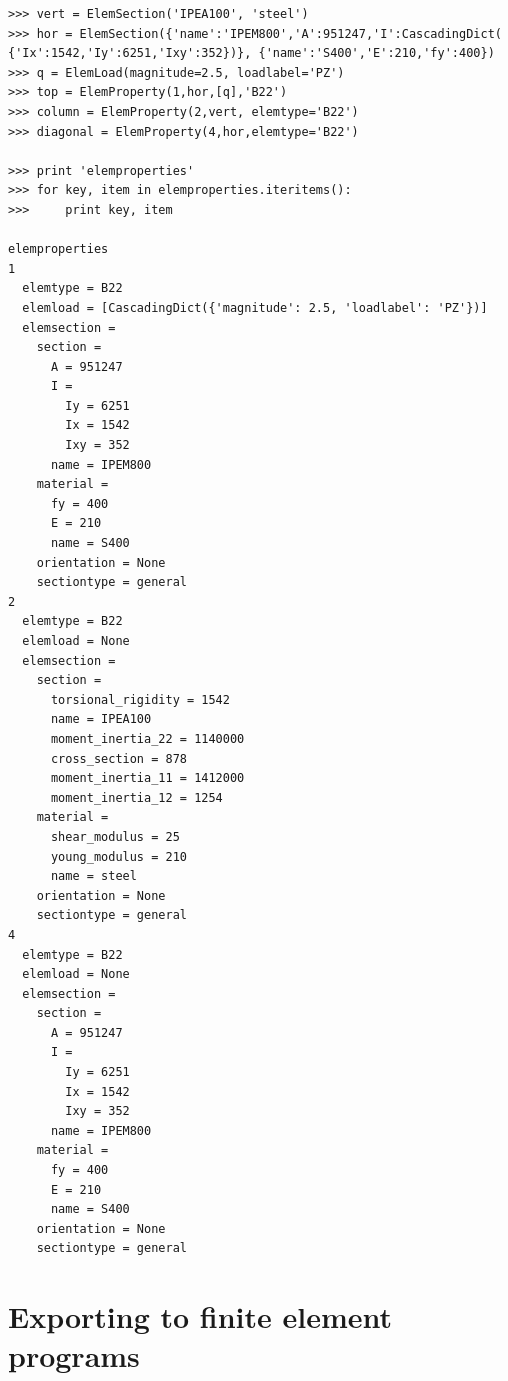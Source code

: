 \begin{verbatim}
>>> vert = ElemSection('IPEA100', 'steel')
>>> hor = ElemSection({'name':'IPEM800','A':951247,'I':CascadingDict(
{'Ix':1542,'Iy':6251,'Ixy':352})}, {'name':'S400','E':210,'fy':400})
>>> q = ElemLoad(magnitude=2.5, loadlabel='PZ')
>>> top = ElemProperty(1,hor,[q],'B22')
>>> column = ElemProperty(2,vert, elemtype='B22')
>>> diagonal = ElemProperty(4,hor,elemtype='B22')

>>> print 'elemproperties'
>>> for key, item in elemproperties.iteritems():
>>>     print key, item    

elemproperties
1
  elemtype = B22
  elemload = [CascadingDict({'magnitude': 2.5, 'loadlabel': 'PZ'})]
  elemsection =
    section =
      A = 951247
      I =
        Iy = 6251
        Ix = 1542
        Ixy = 352
      name = IPEM800
    material =
      fy = 400
      E = 210
      name = S400
    orientation = None
    sectiontype = general
2
  elemtype = B22
  elemload = None
  elemsection =
    section =
      torsional_rigidity = 1542
      name = IPEA100
      moment_inertia_22 = 1140000
      cross_section = 878
      moment_inertia_11 = 1412000
      moment_inertia_12 = 1254
    material =
      shear_modulus = 25
      young_modulus = 210
      name = steel
    orientation = None
    sectiontype = general
4
  elemtype = B22
  elemload = None
  elemsection =
    section =
      A = 951247
      I =
        Iy = 6251
        Ix = 1542
        Ixy = 352
      name = IPEM800
    material =
      fy = 400
      E = 210
      name = S400
    orientation = None
    sectiontype = general
\end{verbatim}


%
\section{Exporting to finite element programs}


%
